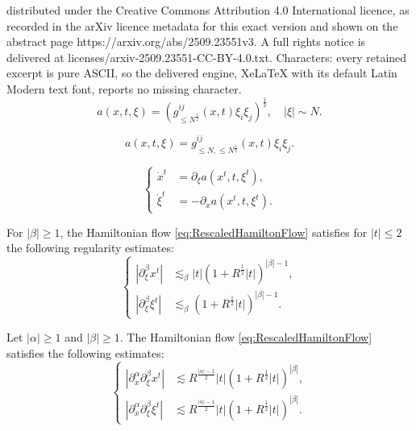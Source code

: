 \documentclass[10pt,a4paper]{amsart}
\begin{document}
distributed under the Creative Commons Attribution 4.0 International licence, as recorded in the arXiv licence metadata for this exact version and shown on the abstract page https://arxiv.org/abs/2509.23551v3. A full rights notice is delivered at licenses/arxiv-2509.23551-CC-BY-4.0.txt. Characters: every retained excerpt is pure ASCII, so the delivered engine, XeLaTeX with its default Latin Modern text font, reports no missing character.
\begin{equation}
\label{eq:1HomogeneousA}
a(x,t,\xi) = (g^{ij}_{\leq N^{\frac{1}{2}}}(x,t) \xi_i \xi_j)^{\frac{1}{2}}, \quad |\xi| \sim N.
\end{equation}

\begin{equation}
\label{eq:SchroedingerSymbol}
a(x,t,\xi) = g^{ij}_{\leq N, \leq N^{\frac{1}{2}}}(x,t) \xi_i \xi_j.
\end{equation} 

\begin{equation}
\label{eq:RescaledHamiltonFlow}
\left\{ \begin{array}{cl}
\dot{x}^t &= \partial_{\xi} a(x^t,t,\xi^t), \\
\dot{\xi}^t &= - \partial_x a(x^t,t,\xi^t).
\end{array} \right.
\end{equation}

\begin{lemma}
\label{lem:HamiltonFlowFrequencyRegularity}
For $|\beta| \geq 1$, the Hamiltonian flow \eqref{eq:RescaledHamiltonFlow} satisfies for $|t| \leq 2$ the following regularity estimates:
\begin{equation}
\label{eq:RegularityHamiltonFlowFrequencies}
\left\{ \begin{array}{cl}
|\partial_{\xi}^{\beta} x^t| &\lesssim_{\beta} |t| (1+ R^{\frac{1}{2}} |t|)^{|\beta|-1}, \\
|\partial_{\xi}^{\beta} \xi^t| &\lesssim_{\beta} (1+ R^{\frac{1}{2}} |t|)^{|\beta|-1}.
\end{array} \right.
\end{equation}
\end{lemma}

\begin{lemma}
\label{lem:HamiltonFlowMixedRegularityII}
Let $|\alpha| \geq 1$ and $|\beta| \geq 1$. The Hamiltonian flow \eqref{eq:RescaledHamiltonFlow} satisfies the following estimates:
\begin{equation}
\label{eq:MixedRegularityHigherOrder}
\left\{ \begin{array}{cl}
| \partial_x^{\alpha} \partial_{\xi}^{\beta} x^t| &\lesssim R^{\frac{|\alpha|-1}{2}} |t| (1+R^{\frac{1}{2}} |t|)^{|\beta|}, \\
| \partial_x^{\alpha} \partial_{\xi}^{\beta} \xi^t| &\lesssim R^{\frac{|\alpha|-1}{2}} |t| (1+R^{\frac{1}{2}} |t|)^{|\beta|}.
\end{array} \right.
\end{equation}
\end{lemma}
\end{document}
